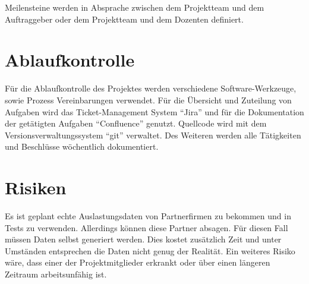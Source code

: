Meilensteine werden in Absprache zwischen dem Projektteam und dem Auftraggeber
oder dem Projektteam und dem Dozenten definiert.

\section{Ablaufkontrolle}

Für die Ablaufkontrolle des Projektes werden verschiedene Software-Werkzeuge,
sowie Prozess Vereinbarungen verwendet. Für die Übersicht und Zuteilung von
Aufgaben wird das Ticket-Management System ``Jira'' und für die Dokumentation
der getätigten Aufgaben ``Confluence'' genutzt. Quellcode wird mit dem
Versionsverwaltungssystem ``git'' verwaltet. Des Weiteren werden alle
Tätigkeiten und Beschlüsse wöchentlich dokumentiert.

\section{Risiken}
Es ist geplant echte Auslastungsdaten von Partnerfirmen zu bekommen und in 
Tests zu verwenden. Allerdings können diese Partner absagen. Für diesen Fall
müssen Daten selbst generiert werden. Dies kostet zusätzlich Zeit und unter
Umständen entsprechen die Daten nicht genug der Realität. Ein weiteres Risiko
wäre, dass einer der Projektmitglieder erkrankt oder über einen längeren
Zeitraum arbeitsunfähig ist.

